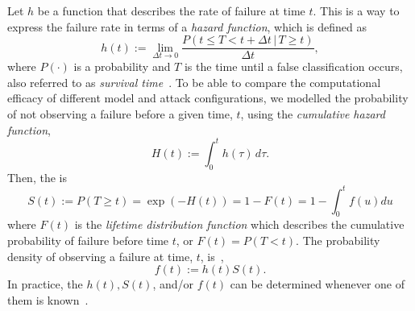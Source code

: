 Let $h$ be a function that describes the rate of failure at time $t$.
This is a way to express the failure rate in terms of a \textit{hazard function}, which is defined as
\begin{equation}
    h(t) := \lim_{ \Delta t \rightarrow 0} \frac{P(t \leq T < t + \Delta t \,|\, T \geq t)}{\Delta t},
    \label{eq:failure_rate_h}
\end{equation}
where  $P(\cdot)$ is a probability and $T$ is the time until a false classification occurs, also referred to as \textit{survival time}~\cite{kleinbaum1996survival}. To be able to compare the computational efficacy of different model and attack configurations, we modelled the probability of not observing a failure before a given time, $t$, using the \textit{cumulative hazard function},
\begin{equation}
     H(t) := \int_0^{t} h(\tau) \,d\tau.
     \label{eq:cdf}
\end{equation}
Then, the  is 
\begin{equation}
    S(t) := P(T \geq t) = \exp(-H(t)) = 1 - F(t) = 1-   \int_0^t f(u)du
    \label{eq:S(t)}
\end{equation}
where $F(t)$ is the \textit{lifetime distribution function} which describes the cumulative probability of failure before time $t$, or $F(t) = P(T < t)$.
The probability density of observing a failure at time, $t$, is~\cite{kleinbaum1996survival},
\begin{equation*}
    f(t) := h(t)S(t).
    \label{eq:pdf}
\end{equation*}
In practice, the $h(t), S(t)$, and/or $f(t)$ can be determined whenever one of them is known~\cite{kleinbaum1996survival}.







